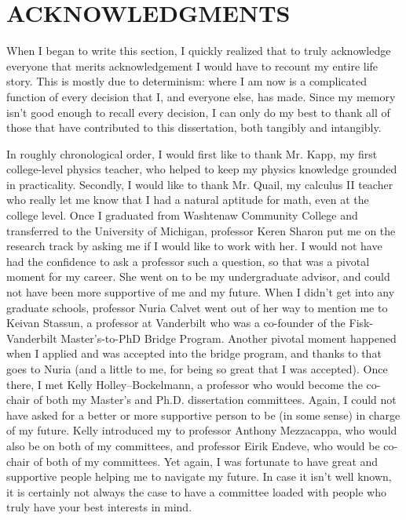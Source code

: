 
\chapter*{ACKNOWLEDGMENTS}
\vspace{7mm}

\begin{doublespace}

When I began to write this section, I quickly realized that to truly
acknowledge everyone that merits acknowledgement I would have to recount
my entire life story.
This is mostly due to determinism: where I am now is a complicated function
of every decision that I, and everyone else, has made.
Since my memory isn't good enough to recall every decision, I can only do my
best to thank all of those that have contributed to this dissertation,
both tangibly and intangibly.

In roughly chronological order, I would first like to thank Mr. Kapp,
my first college-level physics teacher, who
helped to keep my physics knowledge grounded in practicality.
Secondly, I would like to thank Mr. Quail, my calculus II teacher
who really let me know that I had
a natural aptitude for math, even at the college level.
Once I graduated from Washtenaw Community College and transferred to the
University of Michigan, professor Keren Sharon put me on the research track
by asking me if I would like to work with her.
I would not have had the confidence to ask a professor such a question,
so that was a pivotal moment for my career.
She went on to be my undergraduate advisor, and could not have been more
supportive of me and my future.
When I didn't get into any graduate schools, professor Nuria Calvet went out
of her way to mention me to Keivan Stassun, a professor at Vanderbilt
who was a co-founder of the Fisk-Vanderbilt Master's-to-PhD Bridge Program.
Another pivotal moment happened when I applied and was accepted into the
bridge program, and thanks to that goes to Nuria (and a little to me,
for being so great that I was accepted).
Once there, I met Kelly Holley--Bockelmann, a professor who would become the
co-chair of both my Master's and Ph.D. dissertation committees.
Again, I could not have asked for a better or more supportive person to be
(in some sense) in charge of my future.
Kelly introduced my to professor Anthony Mezzacappa,
who would also be on both of my
committees, and professor Eirik Endeve,
who would be co-chair of both of my committees.
Yet again, I was fortunate to have great and supportive people helping me to
navigate my future.
In case it isn't well known,
it is certainly not always the case to have a committee
loaded with people who truly have your best interests in mind.


\end{doublespace}
